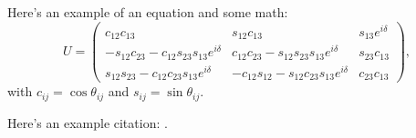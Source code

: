 Here's an example of an equation and some math:
\begin{equation}
  U = \begin{pmatrix} c_{12}c_{13} & s_{12}c_{13} & s_{13}e^{i\delta}\\
    -s_{12}c_{23} - c_{12}s_{23}s_{13}e^{i\delta} & c_{12}c_{23} - s_{12}s_{23}s_{13}e^{i\delta} & s_{23}c_{13}\\
    s_{12}s_{23} - c_{12}c_{23}s_{13}e^{i\delta} & -c_{12}s_{12} - s_{12}c_{23}s_{13}e^{i\delta} & c_{23}c_{13}
  \end{pmatrix},
\end{equation}
with $c_{ij} = \cos{\theta_{ij}}$ and $s_{ij} = \sin{\theta_{ij}}$.

Here's an example citation: \citep{PDG}.